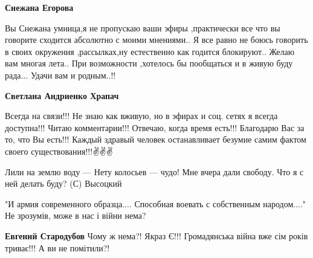 \begin{itemize}
\begin{itemize}
\textbf{Снежана Егорова} 

\obeycr
Вы Снежана умница,я не пропускаю ваши эфиры ,практически все что вы говорите сходится абсолютно с моими мнениями..
Я все равно не боюсь говорить в своих окружения ,рассылках,ну естественно как годится блокируют..
Желаю вам многая лета..
При возможности ,хотелось бы пообщаться и в живую буду рада...
Удачи вам и родным..!!
\restorecr

 
\textbf{Светлана Андриенко Храпач} 

\obeycr
Всегда на связи!!!
Не знаю как вживую, но в эфирах и соц. сетях я всегда доступна!!!
Читаю комментарии!!!
Отвечаю, когда время есть!!!
Благодарю Вас за то, что Вы есть!!!
Каждый здравый человек останавливает безумие самим фактом своего существования!!!✌️✌️✌️
\restorecr

\end{itemize}

 

\obeycr
Лили на землю воду —
Нету колосьев — чудо!
Мне вчера дали свободу.
Что я с ней делать буду? (С) Высоцкий
\restorecr


 

"И армия современного образца....
Способная воевать с собственным народом...."
Не зрозумів, може в нас і війни нема?

\begin{itemize}
 
\textbf{Евгений Стародубов} Чому ж нема?!
Якраз Є!!!
Громадянська війна вже сім років триває!!!
А ви не помітили?!


\end{itemize}
\end{itemize}
